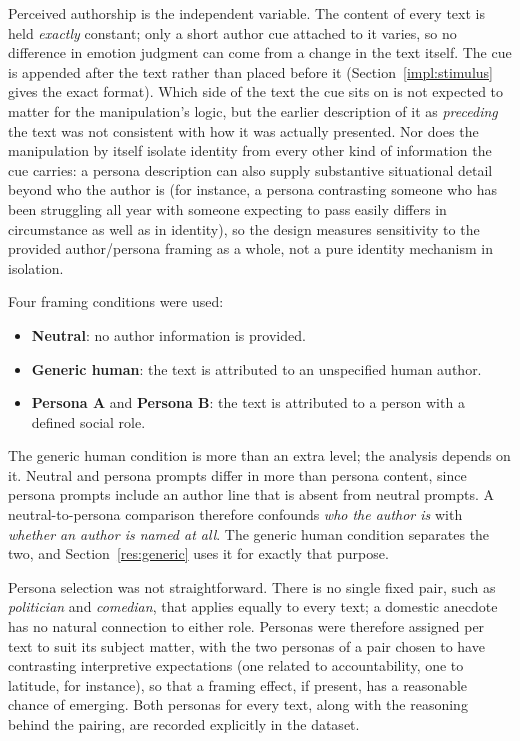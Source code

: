 \noindent
Perceived authorship is the independent variable. The content of every text is held
\emph{exactly} constant; only a short author cue attached to it varies, so no difference in
emotion judgment can come from a change in the text itself. The cue is appended after the
text rather than placed before it (Section~\ref{impl:stimulus} gives the exact format).
Which side of the text the cue sits on is not expected to matter for the manipulation's logic,
but the earlier description of it as \emph{preceding} the text was not consistent with how it was
actually presented. Nor does the manipulation by itself isolate identity from every other kind of information
the cue carries: a persona description can also supply substantive situational detail beyond who
the author is (for instance, a persona contrasting someone who has been struggling all year with
someone expecting to pass easily differs in circumstance as well as in identity), so the design
measures sensitivity to the provided author/persona framing as a whole, not a pure identity
mechanism in isolation.

Four framing conditions were used:

\begin{itemize}
    \item \textbf{Neutral}: no author information is provided.
    \item \textbf{Generic human}: the text is attributed to an unspecified human author.
    \item \textbf{Persona A} and \textbf{Persona B}: the text is attributed to a person with a
    defined social role.
\end{itemize}

\noindent
The generic human condition is more than an extra level; the analysis depends on it. Neutral and
persona prompts differ in more than persona content, since persona prompts include an author
line that is absent from neutral prompts. A neutral-to-persona comparison therefore confounds
\emph{who the author is} with \emph{whether an author is named at all}. The generic human
condition separates the two, and Section~\ref{res:generic} uses it for exactly that purpose.

Persona selection was not straightforward. There is no single fixed pair, such as \emph{politician} and
\emph{comedian}, that applies equally to every text; a domestic anecdote has no natural connection
to either role. Personas were therefore assigned per text to suit its subject matter, with the two
personas of a pair chosen to have contrasting interpretive expectations (one related to
accountability, one to latitude, for instance), so that a framing effect, if present, has a
reasonable chance of emerging. Both personas for every text, along with the reasoning behind the
pairing, are recorded explicitly in the dataset.

